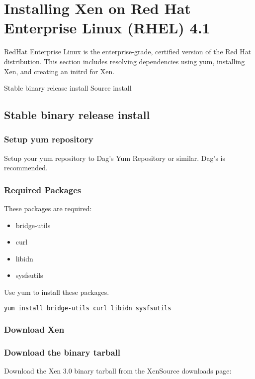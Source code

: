 \chapter{Installing Xen on Red Hat Enterprise Linux (RHEL) 4.1}

RedHat Enterprise Linux is the enterprise-grade, certified version of the Red Hat distribution. This section includes resolving dependencies using yum, installing Xen, and creating an initrd for Xen.

Stable binary release install
Source install
\section{Stable binary release install}

\subsection{Setup yum repository}

Setup your yum repository to Dag's Yum Repository or similar. Dag's is recommended.

\subsection{Required Packages}

These packages are required:

\begin{itemize}
\item bridge-utils
\item curl
\item libidn
\item sysfsutils
\end{itemize}

Use yum to install these packages.

\begin{verbatim}
yum install bridge-utils curl libidn sysfsutils
\end{verbatim}

\subsection{Download Xen}

\subsection{Download the binary tarball}
Download the Xen 3.0 binary tarball from the XenSource downloads page:

